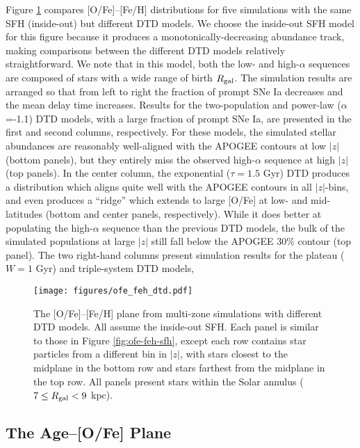 \documentclass[modern,linenumbers]{aastex631}
\begin{document}
Figure \ref{fig:ofe-feh-dtd} compares [O/Fe]--[Fe/H] distributions for five simulations with the same SFH (inside-out) but different DTD models. We choose the inside-out SFH model for this figure because it produces a monotonically-decreasing abundance track, making comparisons between the different DTD models relatively straightforward. We note that in this model, both the low- and high-$\alpha$ sequences are composed of stars with a wide range of birth $R_{\rm gal}$. The simulation results are arranged so that from left to right the fraction of prompt SNe Ia decreases and the mean delay time increases. Results for the two-population and power-law ($\alpha$=-1.1) DTD models, with a large fraction of prompt SNe Ia, are presented in the first and second columns, respectively. For these models, the simulated stellar abundances are reasonably well-aligned with the APOGEE contours at low $|z|$ (bottom panels), but they entirely miss the observed high-$\alpha$ sequence at high $|z|$ (top panels). In the center column, the exponential ($\tau=1.5$ Gyr) DTD produces a distribution which aligns quite well with the APOGEE contours in all $|z|$-bins, and even produces a ``ridge'' which extends to large [O/Fe] at low- and mid-latitudes (bottom and center panels, respectively). While it does better at populating the high-$\alpha$ sequence than the previous DTD models, the bulk of the simulated populations at large $|z|$ still fall below the APOGEE 30\% contour (top panel). The two right-hand columns present simulation results for the plateau ($W=1$ Gyr) and triple-system DTD models, 

\begin{figure*}
    \centering
    \texttt{[image: figures/ofe\_feh\_dtd.pdf]}
    \caption{The [O/Fe]--[Fe/H] plane from multi-zone simulations with different DTD models. All assume the inside-out SFH. Each panel is similar to those in Figure \ref{fig:ofe-feh-sfh}, except each row contains star particles from a different bin in $|z|$, with stars closest to the midplane in the bottom row and stars farthest from the midplane in the top row. All panels present stars within the Solar annulus ($7\leq R_{\rm gal}<9$ kpc).}
    \label{fig:ofe-feh-dtd}
\end{figure*}

\subsection{The Age--[O/Fe] Plane}
\label{sec:age-ofe}
\end{document}

